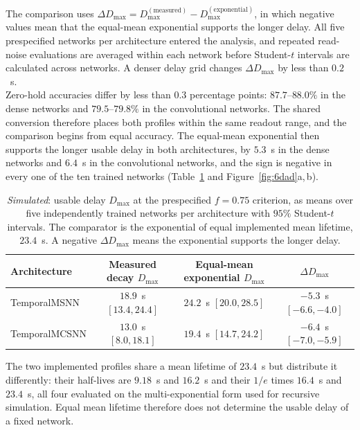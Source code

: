 \noindent The comparison uses
$\Delta D_{\max}=D_{\max}^{(\mathrm{measured})}-D_{\max}^{(\mathrm{exponential})}$, in which negative values mean
that the equal-mean exponential supports the longer delay. All five prespecified networks per architecture entered
the analysis, and repeated read-noise evaluations are averaged within each network before Student-$t$ intervals are
calculated across networks. A denser delay grid changes $\Delta D_{\max}$ by less than $0.2$~s.\\

\noindent Zero-hold accuracies differ by less than $0.3$ percentage points: $87.7$--$88.0\%$ in the dense networks
and $79.5$--$79.8\%$ in the convolutional networks. The shared conversion therefore places both profiles within the
same readout range, and the comparison begins from equal accuracy. The equal-mean exponential then supports the
longer usable delay in both architectures, by $5.3$~s in the dense networks and $6.4$~s in the convolutional
networks, and the sign is negative in every one of the ten trained networks (Table~\ref{tab:6dmax} and
Figure~\ref{fig:6dad}a,\,b).\\

\begin{table}[htbp!]
    \centering
    \caption[Usable delay under each decay profile.]{\emph{Simulated}: usable delay $D_{\max}$ at the prespecified
    $f=0.75$ criterion, as means over five independently trained networks per architecture with $95\%$
    Student-$t$ intervals. The comparator is the exponential of equal implemented mean lifetime, $23.4$~s. A negative
    $\Delta D_{\max}$ means the exponential supports the longer delay.}
    \label{tab:6dmax}
    \footnotesize
    \begin{tabular}{@{}lccc@{}}
        \toprule
        Architecture & Measured decay $D_{\max}$ & Equal-mean exponential $D_{\max}$ & $\Delta D_{\max}$ \\
        \midrule
        TemporalMSNN  & $18.9$~s $[13.4, 24.4]$ & $24.2$~s $[20.0, 28.5]$ & $-5.3$~s $[-6.6, -4.0]$ \\
        TemporalMCSNN & $13.0$~s $[8.0, 18.1]$  & $19.4$~s $[14.7, 24.2]$ & $-6.4$~s $[-7.0, -5.9]$ \\
        \bottomrule
    \end{tabular}
\end{table}

\noindent The two implemented profiles share a mean lifetime of $23.4$~s but distribute it differently: their
half-lives are $9.18$~s and $16.2$~s and their $1/e$ times $16.4$~s and $23.4$~s, all four evaluated on the
multi-exponential form used for recursive simulation. Equal mean lifetime therefore does not determine the usable
delay of a fixed network.\\

